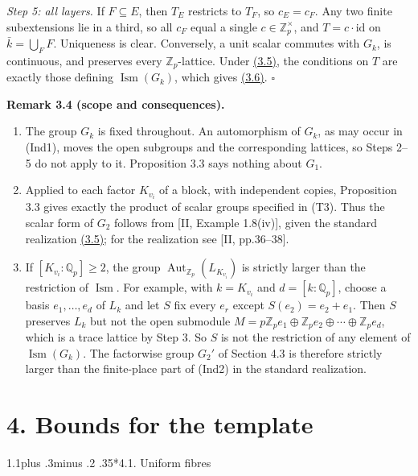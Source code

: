\documentclass[11pt,a4paper]{amsart}
\makeatletter
\renewcommand\subsection{\@startsection{subsection}{2}{\z@}
{1.1\baselineskip plus .3\baselineskip minus .2\baselineskip}
{.35\baselineskip}{\normalfont\bfseries}}
\makeatother
\begin{document}
\emph{Step 5: all layers.} If $F\subseteq E$, then $T_E$ restricts to $T_F$, so $c_E=c_F$. Any two finite subextensions lie in a third, so all $c_F$ equal a single $c\in\mathbb Z_p^\times$, and $T=c\cdot\mathrm{id}$ on $\bar k=\bigcup_FF$. Uniqueness is clear. Conversely, a unit scalar commutes with $G_k$, is continuous, and preserves every $\mathbb Z_p$-lattice. Under \hyperref[eq:3.5]{(3.5)}, the conditions on $T$ are exactly those defining $\operatorname{Ism}(G_k)$, which gives \hyperref[eq:3.6]{(3.6)}. \hfill$\square$

\par\smallskip\noindent\textbf{Remark 3.4 (scope and consequences).}
\begin{enumerate}
\item The group $G_k$ is fixed throughout. An automorphism of $G_k$, as may occur in (Ind1), moves the open subgroups and the corresponding lattices, so Steps 2--5 do not apply to it. Proposition 3.3 says nothing about $G_1$.
\item Applied to each factor $K_{v_i}$ of a block, with independent copies, Proposition 3.3 gives exactly the product of scalar groups specified in (T3). Thus the scalar form of $G_2$ follows from [II, Example 1.8(iv)], given the standard realization \hyperref[eq:3.5]{(3.5)}; for the realization see [II, pp.36--38].
\item If $[K_{v_i}:\mathbb Q_p]\ge2$, the group $\operatorname{Aut}_{\mathbb Z_p}(L_{K_{v_i}})$ is strictly larger than the restriction of $\operatorname{Ism}$. For example, with $k=K_{v_i}$ and $d=[k:\mathbb Q_p]$, choose a basis $e_1,\dots,e_d$ of $L_k$ and let $S$ fix every $e_r$ except $S(e_2)=e_2+e_1$. Then $S$ preserves $L_k$ but not the open submodule $M=p\mathbb Z_pe_1\oplus\mathbb Z_pe_2\oplus\cdots\oplus\mathbb Z_pe_d$, which is a trace lattice by Step 3. So $S$ is not the restriction of any element of $\operatorname{Ism}(G_k)$. The factorwise group $G_2'$ of Section 4.3 is therefore strictly larger than the finite-place part of (Ind2) in the standard realization.
\end{enumerate}

\section*{4. Bounds for the template}

\subsection*{4.1. Uniform fibres}
\end{document}
